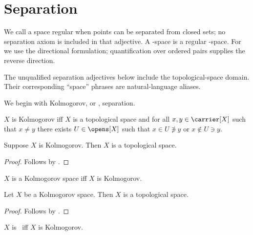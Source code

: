 


\section{Separation}\label{form_sec_separation}

We call a space regular when points can be separated from closed sets; no
separation axiom is included in that adjective.  A \teethree-space is a
regular \teezero-space.  For \teeone we use the directional formulation;
quantification over ordered pairs supplies the reverse direction.

The unqualified separation adjectives below include the topological-space
domain. Their corresponding ``space'' phrases are natural-language aliases.

We begin with Kolmogorov, or \teezero, separation.

\begin{definition}\label{is_kolmogorov}
    $X$ is Kolmogorov iff $X$ is a topological space and
        for all $x,y\in\carrier[X]$ such that
            $x\neq y$ there exists $U\in\opens[X]$ such that
            $x\in U\not\ni y$ or $x\notin U\ni y$.
\end{definition}

\begin{classification}\label{kolmogorov_is_topological}
    Suppose $X$ is Kolmogorov.
    Then $X$ is a topological space.
\end{classification}
\begin{proof}
    Follows by .
\end{proof}

\begin{abbreviation}\label{kolmogorov_space}
    $X$ is a Kolmogorov space iff $X$ is Kolmogorov.
\end{abbreviation}

\begin{classification}\label{kolmogorov_space_is_topological}
    Let $X$ be a Kolmogorov space.
    Then $X$ is a topological space.
\end{classification}
\begin{proof}
    Follows by .
\end{proof}

\begin{abbreviation}\label{teezero}
    $X$ is \teezero\ iff $X$ is Kolmogorov.
\end{abbreviation}

